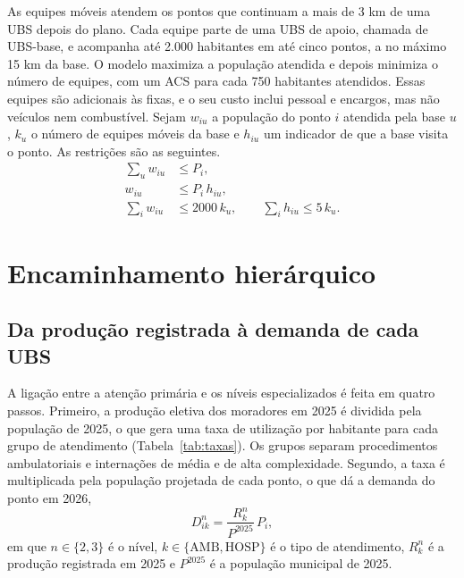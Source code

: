 \documentclass[12pt,a4paper,oneside]{report}
\begin{document}
As equipes móveis atendem os pontos que continuam a mais de 3 km de uma UBS depois do plano. Cada equipe
parte de uma UBS de apoio, chamada de UBS-base, e acompanha até 2.000 habitantes em até cinco pontos, a no
máximo 15 km da base. O modelo maximiza a população atendida e depois minimiza o número de equipes, com
um ACS para cada 750 habitantes atendidos. Essas equipes são adicionais às fixas, e o seu custo inclui
pessoal e encargos, mas não veículos nem combustível. Sejam $w_{iu}$ a população do ponto $i$ atendida
pela base $u$, $k_u$ o número de equipes móveis da base e $h_{iu}$ um indicador de que a base visita o
ponto. As restrições são as seguintes.
\begin{align}
\sum_u w_{iu}&\leq P_i,\\
w_{iu}&\leq P_i\,h_{iu},\\
\sum_i w_{iu}&\leq2000\,k_u,\qquad\sum_i h_{iu}\leq5\,k_u.
\end{align}

\section{Encaminhamento hierárquico}\label{sec:enc}

\subsection{Da produção registrada à demanda de cada UBS}\label{sec:ligacao}
A ligação entre a atenção primária e os níveis especializados é feita em quatro passos. Primeiro, a
produção eletiva dos moradores em 2025 é dividida pela população de 2025, o que gera uma taxa de
utilização por habitante para cada grupo de atendimento (Tabela~\ref{tab:taxas}). Os grupos separam
procedimentos ambulatoriais e internações de média e de alta complexidade. Segundo, a taxa é
multiplicada pela população projetada de cada ponto, o que dá a demanda do ponto em 2026,
\begin{equation}
D^n_{ik}=\frac{R^n_k}{P^{2025}}\,P_i,\label{eq:demanda}
\end{equation}
em que $n\in\{2,3\}$ é o nível, $k\in\{\mathrm{AMB},\mathrm{HOSP}\}$ é o tipo de atendimento, $R^n_k$ é a
produção registrada em 2025 e $P^{2025}$ é a população municipal de 2025.
\end{document}
